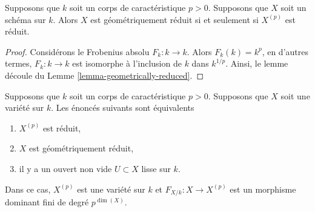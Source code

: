 \begin{lemma}
\label{lemma-geometrically-reduced-p}
Supposons que $k$ soit un corps de caractéristique $p > 0$. Supposons que $X$ soit un
schéma sur $k$. Alors $X$ est géométriquement réduit si et seulement si $X^{(p)}$ est réduit.
\end{lemma}

\begin{proof}
Considérons le Frobenius absolu $F_k : k \to k$. Alors
$F_k(k) = k^p$, en d'autres termes, $F_k : k \to k$ est
isomorphe à l'inclusion de $k$ dans $k^{1/p}$. Ainsi, le
lemme découle du Lemme \ref{lemma-geometrically-reduced}.
\end{proof}

\begin{lemma}
\label{lemma-inseparable-deg-p-smooth}
Supposons que $k$ soit un corps de caractéristique $p > 0$. Supposons
que $X$ soit une variété sur $k$. Les énoncés suivants sont équivalents
\begin{enumerate}
\item $X^{(p)}$ est réduit, \item $X$ est
géométriquement réduit, \item il y a un
ouvert non vide $U \subset X$ lisse sur $k$.
\end{enumerate}
Dans ce cas, $X^{(p)}$ est une variété sur $k$ et $F_{X/k} : X
\to X^{(p)}$ est un morphisme dominant fini de degré $p^{\dim(X)}$.
\end{lemma}

